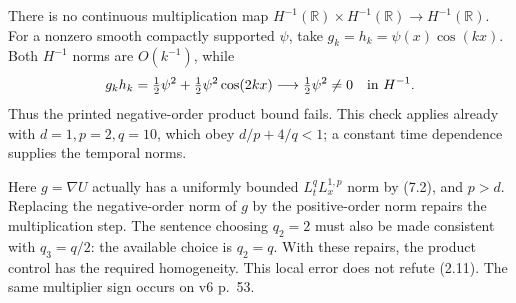 \documentclass[10pt]{article}
\begin{document}
There is no continuous multiplication map \(H^{-1}(\mathbb R)\times H^{-1}(\mathbb R)\to H^{-1}(\mathbb R)\). For a nonzero smooth compactly supported \(\psi\), take \(g_k=h_k=\psi(x)\cos(kx)\). Both \(H^{-1}\) norms are \(O(k^{-1})\), while \[g_kh_k=\tfrac12\psi^2+\tfrac12\psi^2\cos(2kx)
\longrightarrow\tfrac12\psi^2\ne0\quad\hbox{in }H^{-1}.\] Thus the printed negative-order product bound fails. This check applies already with \(d=1,p=2,q=10\), which obey \(d/p+4/q<1\); a constant time dependence supplies the temporal norms.\par
Here \(g=\nabla U\) actually has a uniformly bounded \(L^q_tL^{1,p}_x\) norm by (7.2), and \(p>d\). Replacing the negative-order norm of \(g\) by the positive-order norm repairs the multiplication step. The sentence choosing \(q_2=2\) must also be made consistent with \(q_3=q/2\): the available choice is \(q_2=q\). With these repairs, the product control has the required homogeneity. This local error does not refute (2.11). The same multiplier sign occurs on v6 p. 53.\par
\end{document}
